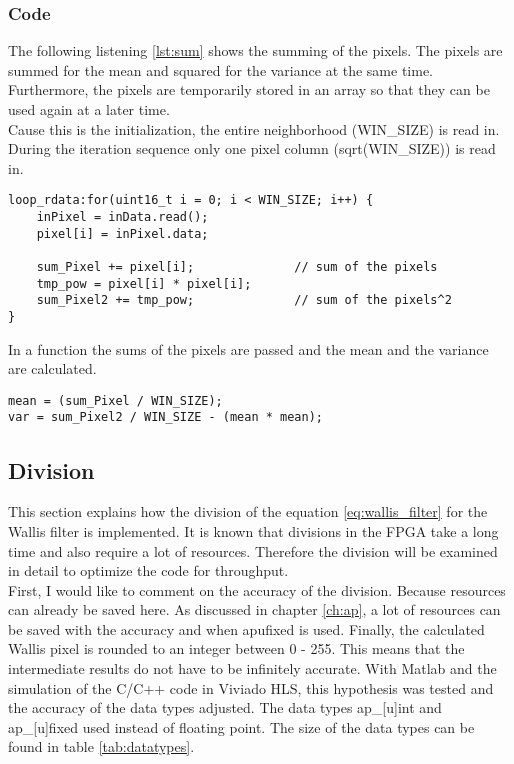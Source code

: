 \subsubsection*{Code}
The following listening \ref{lst:sum} shows the summing of the pixels. The pixels are summed for the mean and squared for the variance at the same time. Furthermore, the pixels are temporarily stored in an array so that they can be used again at a later time. \\
Cause this is the initialization, the entire neighborhood (WIN\_SIZE) is read in. During the iteration sequence only one pixel column (sqrt(WIN\_SIZE)) is read in. \\
\begin{minipage}{\textwidth}
\begin{lstlisting}[style=CStyle, caption=Calculation of the sum, label=lst:sum]
loop_rdata:for(uint16_t i = 0; i < WIN_SIZE; i++) {
	inPixel = inData.read();
	pixel[i] = inPixel.data;

	sum_Pixel += pixel[i];				// sum of the pixels
	tmp_pow = pixel[i] * pixel[i];
	sum_Pixel2 += tmp_pow;				// sum of the pixels^2
}
\end{lstlisting}
\end{minipage}

In a function the sums of the pixels are passed and the mean and the variance are calculated. \\
\begin{minipage}{\textwidth}
\begin{lstlisting}[style=CStyle, caption=Calculation of the mean and variance, label=lst:mean_var]
mean = (sum_Pixel / WIN_SIZE);
var = sum_Pixel2 / WIN_SIZE - (mean * mean);
\end{lstlisting}
\end{minipage}


\subsection{Division}
This section explains how the division of the equation \ref{eq:wallis_filter} for the Wallis filter is implemented. It is known that divisions in the FPGA take a long time and also require a lot of resources. Therefore the division will be examined in detail to optimize the code for throughput. \\
First, I would like to comment on the accuracy of the division. Because resources can already be saved here. As discussed in chapter \ref{ch:ap}, a lot of resources can be saved with the accuracy and when apufixed is used.
Finally, the calculated Wallis pixel is rounded to an integer between 0 - 255. This means that the intermediate results do not have to be infinitely accurate. With Matlab and the simulation of the C/C++ code in Viviado HLS, this hypothesis was tested and the accuracy of the data types adjusted. The data types ap\_[u]int and ap\_[u]fixed used instead of floating point. The size of the data types can be found in table \ref{tab:datatypes}. 

